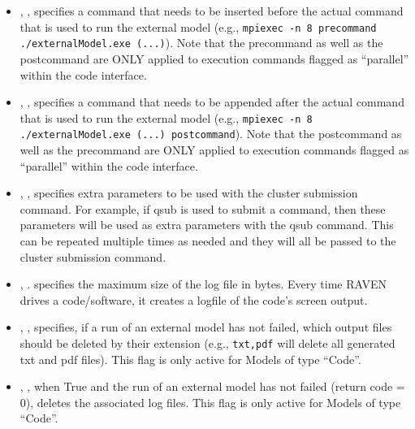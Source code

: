 \begin{itemize}
\item {}, , specifies
a command that needs to be inserted before the actual command that is used to
run the external model (e.g., \texttt{mpiexec -n 8 precommand
./externalModel.exe (...)}).
Note that the precommand as well as the postcommand are ONLY applied to
execution commands flagged as ``parallel'' within the code interface.
%

\item {}, ,
specifies a command that needs to be appended after the actual command that is
used to run the external model (e.g., \texttt{mpiexec -n 8  ./externalModel.exe
(...) postcommand}).
Note that the postcommand as well as the precommand are ONLY applied to
execution commands flagged as ``parallel'' within the code interface.
%

\item {}, ,
  specifies extra parameters to be used with the cluster submission
  command.  For example, if qsub is used to submit a command, then these
  parameters will be used as extra parameters with the qsub command.
  This can be repeated multiple times as needed and they will all be passed
  to the cluster submission command.
%

\item {}, .
specifies the maximum size of the log file in bytes. Every time RAVEN drives a
code/software, it creates a logfile of the code's screen output.
%


\item {}, , specifies, if a run of an external model has not failed, which output
files should be deleted by their extension (e.g.,
\texttt{txt,pdf} will
delete all generated txt and pdf files).
\nb This flag is only active for Models of type ``Code''.
%

\item {}, , when True and
the run of an external model has not failed (return code = 0), deletes
the associated log files.
\nb This flag is only active for Models of type ``Code''.
%



\end{itemize}
